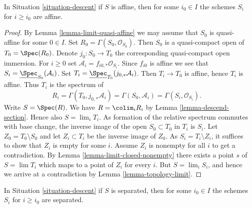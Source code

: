 \begin{lemma}
\label{lemma-limit-affine}
In Situation \ref{situation-descent} if $S$ is affine,
then for some $i_0 \in I$ the schemes $S_i$ for $i \geq i_0$
are affine.
\end{lemma}

\begin{proof}
By Lemma \ref{lemma-limit-quasi-affine} we may assume that $S_0$ is
quasi-affine for some $0 \in I$. Set $R_0 = \Gamma(S_0, \mathcal{O}_{S_0})$.
Then $S_0$ is a quasi-compact open of $T_0 = \Spec(R_0)$. Denote
$j_0 : S_0 \to T_0$ the corresponding quasi-compact open immersion.
For $i \geq 0$ set $\mathcal{A}_i = f_{i0, *}\mathcal{O}_{S_i}$.
Since $f_{i0}$ is affine we see that
$S_i = \underline{\Spec}_{S_0}(\mathcal{A}_i)$.
Set $T_i = \underline{\Spec}_{T_0}(j_{0, *}\mathcal{A}_i)$.
Then $T_i \to T_0$ is affine, hence $T_i$ is affine. Thus
$T_i$ is the spectrum of
$$
R_i = \Gamma(T_0, j_{0, *}\mathcal{A}_i) = \Gamma(S_0, \mathcal{A}_i) =
\Gamma(S_i, \mathcal{O}_{S_i}).
$$
Write $S = \Spec(R)$. We have $R = \colim_i R_i$
by Lemma \ref{lemma-descend-section}.
Hence also $S = \lim_i T_i$. As formation of the relative spectrum commutes
with base change, the inverse image
of the open $S_0 \subset T_0$ in $T_i$ is $S_i$.
Let $Z_0 = T_0 \setminus S_0$ and let $Z_i \subset T_i$
be the inverse image of $Z_0$. As $S_i = T_i \setminus Z_i$, it suffices
to show that $Z_i$ is empty for some $i$. Assume $Z_i$ is nonempty for all
$i$ to get a contradiction. By Lemma \ref{lemma-limit-closed-nonempty}
there exists a point $s$ of $S = \lim T_i$ which maps to a point of $Z_i$
for every $i$. But $S = \lim_i S_i$, and hence we arrive at a contradiction
by Lemma \ref{lemma-topology-limit}.
\end{proof}

\begin{lemma}
\label{lemma-limit-separated}
In Situation \ref{situation-descent} if $S$ is separated,
then for some $i_0 \in I$ the schemes $S_i$ for $i \geq i_0$
are separated.
\end{lemma}

